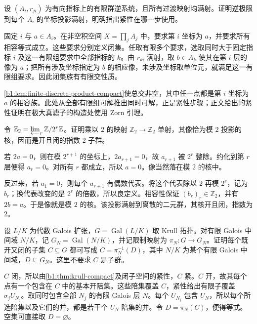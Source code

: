 \begin{exercise}\label{b1:ex:22-5}
	设 \((A_i,r_{ji})\) 为有向指标上的有限群逆系统，且所有过渡映射均满射。证明逆极限到每个 \(A_i\) 的坐标投影满射，明确指出紧性在哪一步使用。
\end{exercise}
\begin{solution}
	固定 \(i\) 与 \(a\in A_i\)。在非空积空间 \(X=\prod_j A_j\) 中，要求第 \(i\) 坐标为 \(a\)，并要求所有相容等式成立。这些要求分别定义闭集。任取有限多个要求，选取同时大于固定指标 \(i\) 及这一有限组要求中全部指标的 \(k\)。由 \(r_{ki}\) 满射，取 \(b\in A_k\) 使其在第 \(i\) 层的像为 \(a\)；把所有涉及坐标指定为 \(b\) 的相应像，未涉及坐标取单位元，就满足这一有限组要求。因此闭集族有有限交性质。

	\cref{b1:lem:finite-discrete-product-compact}使总交非空，其中任一点都是第 \(i\) 坐标为 \(a\) 的相容族。此处从全部有限组可解推出同时可解，正是紧性步骤；正文给出的紧性证明在极大真滤子的构造处使用 Zorn 引理。
\end{solution}

\begin{exercise}\label{b1:ex:22-6}
	令 \(\mathbb Z_2=\varprojlim_r\mathbb Z/2^r\mathbb Z\)。证明乘以 \(2\) 的映射 \(\mathbb Z_2\rightarrow\mathbb Z_2\) 单射，其像恰为模 \(2\) 投影的核，因而是开且闭的指数 \(2\) 子群。
\end{exercise}
\begin{solution}
	若 \(2a=0\)，则在模 \(2^{r+1}\) 的坐标上，\(2a_{r+1}=0\)，故 \(a_{r+1}\) 被 \(2^r\) 整除。约化到第 \(r\) 层便得 \(a_r=0\)。对所有 \(r\) 都成立，所以 \(a=0\)。像当然落在模 \(2\) 的核中。

	反过来，若 \(a_1=0\)，则每个 \(a_{r+1}\) 有偶数代表。将这个代表除以 \(2\) 再模 \(2^r\)，记为 \(b_r\)；换代表改变的是 \(2^r\) 的倍数，所以良定义。相容性保证 \((b_r)_r\in\mathbb Z_2\)，并有 \(2b=a\)。于是像就是模 \(2\) 的核。该投影满射到离散的二元群，其核开且闭，指数为 \(2\)。
\end{solution}

\begin{exercise}\label{b1:ex:22-7}
	设 \(L/K\) 为代数 Galois 扩张，\(G=\operatorname{Gal}(L/K)\) 取 Krull 拓扑。对有限 Galois 中间域 \(N/K\)，记 \(G_N=\operatorname{Gal}(N/K)\)，并记限制映射为 \(\pi_N:G\to G_N\)。证明每个既开又闭的子集 \(C\subseteq G\) 都可写成 \(C=\pi_N^{-1}(D)\)，其中 \(N/K\) 为某个有限 Galois 中间域，\(D\subseteq G_N\)。这里不要求 \(C\) 是子群。
\end{exercise}
\begin{solution}
	\(C\) 闭，所以由\cref{b1:thm:krull-compact}及闭子空间的紧性，\(C\) 紧。\(C\) 开，故其每个点有一个包含在 \(C\) 中的基本开陪集。这些陪集覆盖 \(C\)，紧性给出有限子覆盖 \(\sigma_jU_{N_j}\)。取同时包含全部 \(N_j\) 的有限 Galois 层 \(N\)。每个 \(U_{N_j}\) 包含 \(U_N\)，所以每个所选陪集以及它们的并，都是若干个 \(U_N\) 陪集的并。令 \(D=\pi_N(C)\)，便得等式。空集可直接取 \(D=\varnothing\)。
\end{solution}

